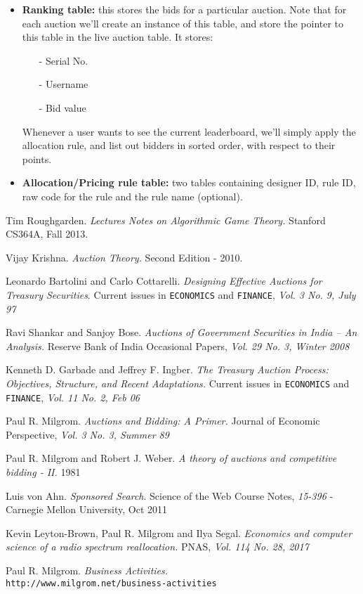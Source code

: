 \documentclass[a4paper]{article}
\begin{document}
\begin{itemize}
    \item \textbf{Ranking table:} this stores the bids for a particular auction. Note that for each auction we'll create an instance of this table, and store the pointer to this table in the live auction table. 
    It stores:
    \begin{itemize}
        \item[-] Serial No.
        \item[-] Username
        \item[-] Bid value
    \end{itemize}
    Whenever a user wants to see the current leaderboard, we'll simply apply the allocation rule, and list out bidders in sorted order, with respect to their points.

    \item \textbf{Allocation/Pricing rule table:} two tables containing designer ID, rule ID, raw code for the rule and the rule name (optional).
\end{itemize}



\pagebreak
\begin{thebibliography}{9}

Tim Roughgarden.
\textit{Lectures Notes on Algorithmic Game Theory.}
Stanford CS364A, Fall 2013.

Vijay Krishna.
\textit{Auction Theory.}
Second Edition - 2010.

Leonardo Bartolini and Carlo Cottarelli.
\textit{Designing Effective Auctions for Treasury Securities}. 
Current issues in \texttt{ECONOMICS} and \texttt{FINANCE}, \textit{Vol. 3 No. 9, July 97}

Ravi Shankar and Sanjoy Bose. 
\textit{Auctions of Government Securities in India – An Analysis.}
Reserve Bank of India Occasional Papers,\textit{ Vol. 29 No. 3, Winter 2008}

Kenneth D. Garbade and Jeffrey F. Ingber.
\textit{The Treasury Auction Process: Objectives, Structure, and Recent Adaptations.}
Current issues in \texttt{ECONOMICS} and \texttt{FINANCE}, \textit{Vol. 11 No. 2, Feb 06}

\bibitem{}
Paul R. Milgrom.
\textit{Auctions and Bidding: A Primer.}
Journal of Economic Perspective, \textit{Vol. 3 No. 3, Summer 89}

Paul R. Milgrom and Robert J. Weber.
\textit{A theory of auctions and competitive bidding - II.}
1981

Luis von Ahn.
\textit{Sponsored Search}.
Science of the Web Course Notes, \textit{15-396} - Carnegie Mellon University, Oct 2011

Kevin Leyton-Brown, Paul R. Milgrom and Ilya Segal.
\textit{Economics and computer science of a radio spectrum reallocation.}
PNAS, \textit{Vol. 114 No. 28, 2017}

Paul R. Milgrom.
\textit{Business Activities.}
\\\texttt{http://www.milgrom.net/business-activities}
\end{thebibliography}
\end{document}
